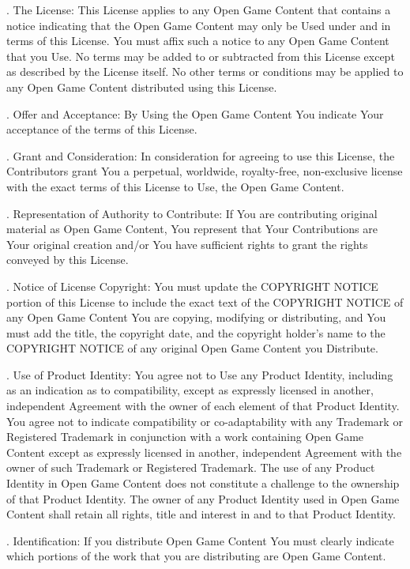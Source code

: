 \begin{scriptsize}
. The License: This License applies to any Open Game Content that contains a notice indicating that the Open Game Content may only be Used under and in terms of this License. You must affix such a notice to any Open Game Content that you Use. No terms may be added to or subtracted from this License except as described by the License itself. No other terms or conditions may be applied to any Open Game Content distributed using this License.

. Offer and Acceptance: By Using the Open Game Content You indicate Your acceptance of the terms of this License.

. Grant and Consideration: In consideration for agreeing to use this License, the Contributors grant You a perpetual, worldwide, royalty-free, non-exclusive license with the exact terms of this License to Use, the Open Game Content.

. Representation of Authority to Contribute: If You are contributing original material as Open Game Content, You represent that Your Contributions are Your original creation and/or You have sufficient rights to grant the rights conveyed by this License.

. Notice of License Copyright: You must update the COPYRIGHT NOTICE portion of this License to include the exact text of the COPYRIGHT NOTICE of any Open Game Content You are copying, modifying or distributing, and You must add the title, the copyright date, and the copyright holder’s name to the COPYRIGHT NOTICE of any original Open Game Content you Distribute.

. Use of Product Identity: You agree not to Use any Product Identity, including as an indication as to compatibility, except as expressly licensed in another, independent Agreement with the owner of each element of that Product Identity. You agree not to indicate compatibility or co-adaptability with any Trademark or Registered Trademark in conjunction with a work containing Open Game Content except as expressly licensed in another, independent Agreement with the owner of such Trademark or Registered Trademark. The use of any Product Identity in Open Game Content does not constitute a challenge to the ownership of that Product Identity. The owner of any Product Identity used in Open Game Content shall retain all rights, title and interest in and to that Product Identity.

. Identification: If you distribute Open Game Content You must clearly indicate which portions of the work that you are distributing are Open Game Content.


\end{scriptsize}
